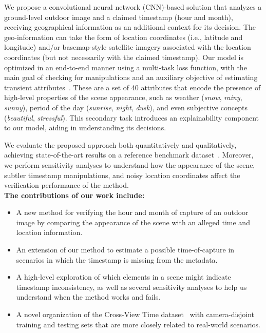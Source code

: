 \documentclass[journal]{IEEEtran}
\begin{document}
    We propose a convolutional neural network (CNN)-based solution that analyzes a ground-level outdoor image and a claimed timestamp (hour and month), receiving geographical information as an additional context for its decision. The geo-information can take the form of location coordinates (i.e., latitude and longitude) and/or basemap-style satellite imagery associated with the location coordinates (but not necessarily with the claimed timestamp). Our model is optimized in an end-to-end manner using a multi-task loss function, with the main goal of checking for manipulations and an auxiliary objective of estimating transient attributes~\cite{laffont2014transient}. These are a set of 40 attributes that encode the presence of high-level properties of the scene appearance, such as weather (\emph{snow}, \emph{rainy}, \emph{sunny}), period of the day (\emph{sunrise}, \emph{night}, \emph{dusk}), and even subjective concepts (\emph{beautiful}, \emph{stressful}). This secondary task introduces an explainability component to our model, aiding in understanding its decisions. 
    
    We evaluate the proposed approach both quantitatively and qualitatively, achieving state-of-the-art results on a reference benchmark dataset~\cite{salem2020learning}. Moreover, we perform sensitivity analyses to understand how the appearance of the scene, subtler timestamp manipulations, and noisy location coordinates affect the verification performance of the method. \\ 
    
    
    \noindent\textbf{The contributions of our work include:}
    \begin{itemize}
        \item A new method for verifying the hour and month of capture of an outdoor image by comparing the appearance of the scene with an alleged time and location information.
        \item An extension of our method to estimate a possible time-of-capture in scenarios in which the timestamp is missing from the metadata.
        \item A high-level exploration of which elements in a scene might indicate timestamp inconsistency, as well as several sensitivity analyses to help us understand when the method works and fails.
        \item A novel organization of the Cross-View Time dataset~\cite{salem2020learning} with camera-disjoint training and testing sets that are more closely related to real-world scenarios.
    \end{itemize}
    
\end{document}
